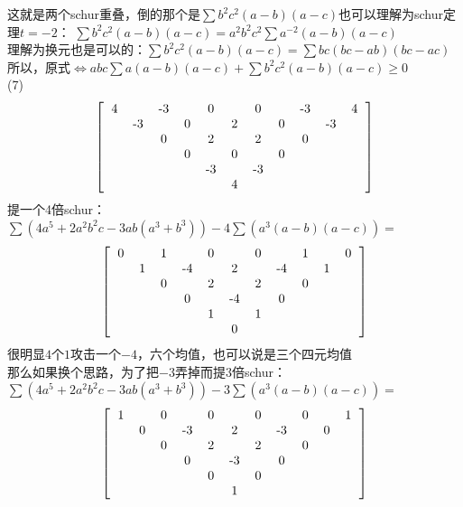 \documentclass[UTF8]{ctexart}
\begin{document}
这就是两个schur重叠，倒的那个是$ \displaystyle  \sum b^{2}c^{2}(a-b)(a-c) $也可以理解为schur定理$ t=-2 $：
$\displaystyle  \sum  b^{2} c^{2}(a-b)(a-c)=a^{2} b^{2} c^{2} \displaystyle  \sum  a^{-2}(a-b)(a-c) $\\
理解为换元也是可以的：$\displaystyle  \sum b^{2} c^{2}(a-b)(a-c)=\displaystyle  \sum b c(b c-a b)(b c-a c)$\\
所以，原式$ \Leftrightarrow abc\sum a(a-b)(a-c)+\sum b^{2} c^{2}(a-b)(a-c)\ge 0 $\\
(7)\renewcommand*{\arraystretch}{1.732}\[\left[\begin{matrix}
	\begin{tabular}{ccccccccccccc}
		4& &-3& &0& &0& &-3& &4\\
		&-3& &0& &2& &0& &-3&\\
		& &0& &2& &2& &0& &\\
		& & &0& &0& &0& & &\\
		& & & &-3& &-3& & & &\\
		& & & & &4& & & & &\\
	\end{tabular}
\end{matrix}\right]\]
提一个4倍schur：$ \displaystyle \sum (4a^{5}+2a^{2}b^{2}c-3ab(a^{3}+b^{3}))-4\displaystyle \sum (a^{3}(a-b)(a-c))= $
\renewcommand*{\arraystretch}{1.732}\[\left[\begin{matrix}
	\begin{tabular}{ccccccccccccc}
		0& &1& &0& &0& &1& &0\\
		&1& &-4& &2& &-4& &1&\\
		& &0& &2& &2& &0& &\\
		& & &0& &-4& &0& & &\\
		& & & &1& &1& & & &\\
		& & & & &0& & & & &\\
	\end{tabular}
\end{matrix}\right]\]
很明显$ 4 $个$ 1 $攻击一个$ -4 $，六个均值，也可以说是三个四元均值\\
那么如果换个思路，为了把$ -3 $弄掉而提$ 3 $倍schur：\\
$ \displaystyle \sum (4a^{5}+2a^{2}b^{2}c-3ab(a^{3}+b^{3}))-3\displaystyle \sum (a^{3}(a-b)(a-c))= $
\renewcommand*{\arraystretch}{1.732}\[\left[\begin{matrix}
	\begin{tabular}{ccccccccccccc}
		1& &0& &0& &0& &0& &1\\
		&0& &-3& &2& &-3& &0&\\
		& &0& &2& &2& &0& &\\
		& & &0& &-3& &0& & &\\
		& & & &0& &0& & & &\\
		& & & & &1& & & & &\\
	\end{tabular}
\end{matrix}\right]\]
\end{document}
